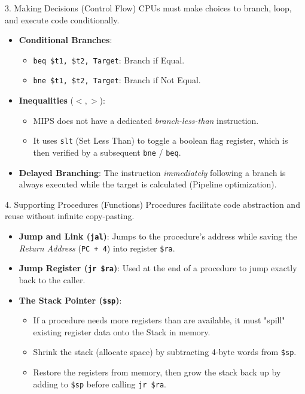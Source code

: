 \documentclass[aspectratio=169]{beamer}
\begin{document}
\begin{frame}{3. Making Decisions (Control Flow)}
CPUs must make choices to branch, loop, and execute code conditionally.
\vspace{0.2cm}
\begin{itemize}
    \item \textbf{Conditional Branches}:
    \begin{itemize}
        \item \texttt{beq \$t1, \$t2, Target}: Branch if Equal.
        \item \texttt{bne \$t1, \$t2, Target}: Branch if Not Equal.
    \end{itemize}
    \vspace{0.2cm}
    \item \textbf{Inequalities} ($<, >$):
    \begin{itemize}
        \item MIPS does not have a dedicated \textit{branch-less-than} instruction.
        \item It uses \texttt{slt} (Set Less Than) to toggle a boolean flag register, which is then verified by a subsequent \texttt{bne} / \texttt{beq}.
    \end{itemize}
    \vspace{0.2cm}
    \item \textbf{Delayed Branching}: The instruction \textit{immediately} following a branch is always executed while the target is calculated (Pipeline optimization).
\end{itemize}
\end{frame}

\begin{frame}{4. Supporting Procedures (Functions)}
Procedures facilitate code abstraction and reuse without infinite copy-pasting.
\vspace{0.2cm}
\begin{itemize}
    \item \textbf{Jump and Link (\texttt{jal})}: Jumps to the procedure's address while saving the \textit{Return Address} (\texttt{PC + 4}) into register \texttt{\$ra}.
    \item \textbf{Jump Register (\texttt{jr \$ra})}: Used at the end of a procedure to jump exactly back to the caller.
    \item \textbf{The Stack Pointer (\texttt{\$sp})}: 
    \begin{itemize}
        \item If a procedure needs more registers than are available, it must "spill" existing register data onto the Stack in memory.
        \item Shrink the stack (allocate space) by subtracting 4-byte words from \texttt{\$sp}.
        \item Restore the registers from memory, then grow the stack back up by adding to \texttt{\$sp} before calling \texttt{jr \$ra}.
    \end{itemize}
\end{itemize}
\end{frame}
\end{document}

